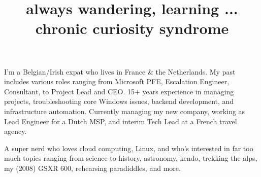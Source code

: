 \documentclass[11pt,a4paper,sans]{moderncv}    %
\title{always wandering, learning ... chronic curiosity syndrome}
\begin{document}
\makecvtitle

I'm a Belgian/Irish expat who lives in France \& the Netherlands. My past includes various roles ranging from Microsoft PFE, Escalation Engineer, Consultant, to Project Lead and CEO. 15+ years experience in managing projects, troubleshooting core Windows issues, backend development, and infrastructure automation. Currently managing my new company, working as Lead Engineer for a Dutch MSP, and interim Tech Lead at a French travel agency. 

A super nerd who loves cloud computing, Linux, and who's interested in far too much topics ranging from science to history, astronomy, kendo, trekking the alps, my (2008) GSXR 600, rehearsing paradiddles, and more.
\end{document}
